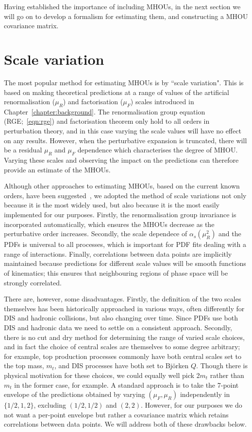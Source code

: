 Having established the importance of including MHOUs, in the next section we will go on to develop a formalism for estimating them, and constructing a MHOU covariance matrix.

\section{Scale variation}
\label{sec:svn}

The most popular method for estimating MHOUs is by ``scale variation". This is based on making theoretical predictions at a range of values of the artificial renormalisation ($\mu_R$) and factorisation ($\mu_F$) scales introduced in Chapter~\ref{chapter:background}. The renormalisation group equation (RGE;~\ref{eqn:rge}) and factorisation theorem only hold to all orders in perturbation theory, and in this case varying the scale values will have no effect on any results. However, when the perturbative expansion is truncated, there will be a residual $\mu_R$ and $\mu_F$ dependence which characterises the degree of MHOU. Varying these scales and observing the impact on the predictions can therefore provide an estimate of the MHOUs. 

Although other approaches to estimating MHOUs, based on the current known orders, have been suggested~\cite{Cacciari:2011ze, David:2013gaa, Bagnaschi:2014wea, Bonvini:2020xeo}, we adopted the method of scale variations not only because it is the most widely used, but also because it is the most easily implemented for our purposes. Firstly, the renormalisation group invariance is incorporated automatically, which ensures the MHOUs decrease as the perturbative order increases. Secondly, the scale dependece of $\alpha_s(\mu_R^2)$ and the PDFs is universal to all processes, which is important for PDF fits dealing with a range of interactions. Finally, correlations between data points are implicitly maintained because predictions for different scale values will be smooth functions of kinematics; this ensures that neighbouring regions of phase space will be strongly correlated.

There are, however, some disadvantages. Firstly, the definition of the two scales themselves has been historically approached in various ways, often differently for DIS and hadronic collisions, but also changing over time. Since PDFs use both DIS and hadronic data we need to settle on a consistent approach. Secondly, there is no cut and dry method for determining the range of varied scale choices, and in fact the choice of central scales are themselves to some degree arbitrary; for example, top production processes commonly have both central scales set to the top mass, $m_t$, and DIS processes have both set to Bj\"orken $Q$. Though there is physical motivation for these choices, we could equally well pick 2$m_t$ rather than $m_t$ in the former case, for example. A standard approach is to take the 7-point envelope of the predictions obtained by varying $(\mu_F, \mu_R)$ independently in $\{1/2, 1, 2\}$, excluding $(1/2, 1/2)$ and $(2,2)$. However, for our purposes we do not want a per-point envelope but rather a covariance matrix which retains correlations between data points. We will address both of these drawbacks below. 

